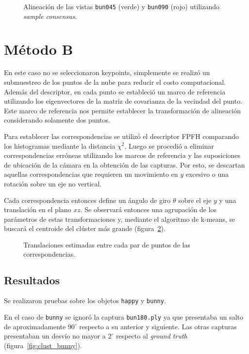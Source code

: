 			\begin{figure}
				\caption{\label{fig:align_sac}Alineación de las vistas \texttt{bun045} (verde) y \texttt{bun090} (rojo) utilizando \emph{sample consensus}.}
			\end{figure}


	\section{Método B}
		En este caso no se seleccionaron keypoints, simplemente se realizó un submuestreo de
		los puntos de la nube para reducir el costo computacional.
		Además del descriptor, en cada punto se estableció un marco de referencia utilizando los
		eigenvectores de la matriz de covarianza de la vecindad del punto. Este
		marco de referencia nos permite establecer
		la transformación de alineación considerando solamente dos puntos\cite{ISS}.

		Para establecer las correspondencias se utilizó el descriptor FPFH
		comparando los histogramas mediante la distancia $\chi^2$.  Luego se
		procedió a eliminar correspondencias erróneas utilizando los marcos de
		referencia y las suposiciones de ubicación de la cámara en la obtención
		de las capturas.  Por esto, se descartan aquellas correspondencias que
		requieren un movimiento en $y$ excesivo o una rotación sobre un eje no
		vertical. 

		Cada correspondencia entonces define un ángulo de giro $\theta$ sobre
		el eje $y$ y una translación en el plano $xz$.  Se observará entonces
		una agrupación de los parámetros de estas transformaciones y, mediante el
		algoritmo de k-means, se buscará el centroide del clúster más grande (figura~\ref{fig:cluster}).
		\begin{figure}
			\caption{\label{fig:cluster}Translaciones estimadas entre cada par
			de puntos de las correspondencias.}
		\end{figure}

		\subsection{Resultados}
			Se realizaron pruebas sobre los objetos \texttt{happy} y \texttt{bunny}.

			En el caso de \texttt{bunny} se ignoró la captura
			\texttt{bun180.ply} ya que presentaba un salto de aproximadamente
			$90^{\circ}$ respecto a su anterior y siguiente.  Las otras
			capturas presentaban un desvío no mayor a $2^{\circ}$ respecto al
			\emph{ground truth} (figura~\ref{fig:clust_bunny}).

